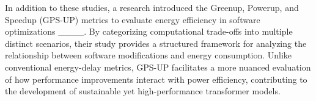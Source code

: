 In addition to these studies, a research introduced the Greenup, Powerup, and Speedup (GPS-UP) metrics to evaluate energy efficiency in software optimizations ____. By categorizing computational trade-offs into multiple distinct scenarios, their study provides a structured framework for analyzing the relationship between software modifications and energy consumption. Unlike conventional energy-delay metrics, GPS-UP facilitates a more nuanced evaluation of how performance improvements interact with power efficiency, contributing to the development of sustainable yet high-performance transformer models.